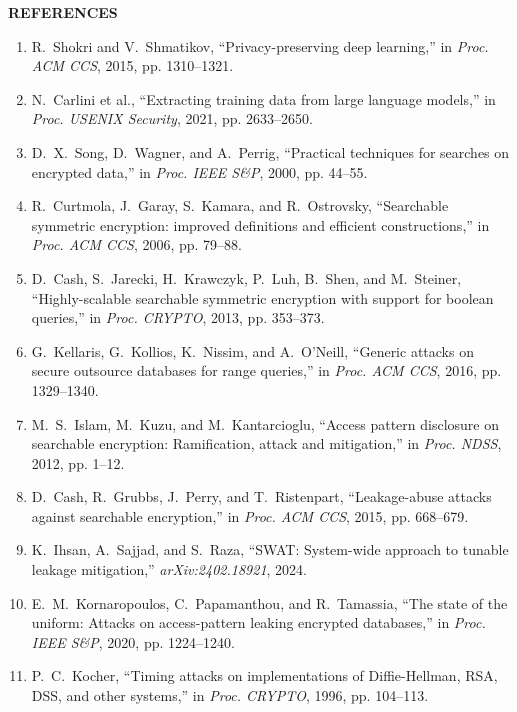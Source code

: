 \documentclass[preview,varwidth=88mm]{standalone}
\begin{document}
\begin{center}
\vspace{-1mm}
{\footnotesize \textbf{REFERENCES}}
\vspace{1mm}
\end{center}
{\scriptsize
\begin{enumerate}
\setlength{\itemsep}{0.5pt}
\setlength{\parskip}{0pt}
\setlength{\parsep}{0pt}
\item[{[1]}] R.~Shokri and V.~Shmatikov, ``Privacy-preserving deep learning,'' in \emph{Proc. ACM CCS}, 2015, pp. 1310--1321.
\item[{[2]}] N.~Carlini et al., ``Extracting training data from large language models,'' in \emph{Proc. USENIX Security}, 2021, pp. 2633--2650.
\item[{[3]}] D.~X.~Song, D.~Wagner, and A.~Perrig, ``Practical techniques for searches on encrypted data,'' in \emph{Proc. IEEE S\&P}, 2000, pp. 44--55.
\item[{[4]}] R.~Curtmola, J.~Garay, S.~Kamara, and R.~Ostrovsky, ``Searchable symmetric encryption: improved definitions and efficient constructions,'' in \emph{Proc. ACM CCS}, 2006, pp. 79--88.
\item[{[5]}] D.~Cash, S.~Jarecki, H.~Krawczyk, P.~Luh, B.~Shen, and M.~Steiner, ``Highly-scalable searchable symmetric encryption with support for boolean queries,'' in \emph{Proc. CRYPTO}, 2013, pp. 353--373.
\item[{[6]}] G.~Kellaris, G.~Kollios, K.~Nissim, and A.~O'Neill, ``Generic attacks on secure outsource databases for range queries,'' in \emph{Proc. ACM CCS}, 2016, pp. 1329--1340.
\item[{[7]}] M.~S.~Islam, M.~Kuzu, and M.~Kantarcioglu, ``Access pattern disclosure on searchable encryption: Ramification, attack and mitigation,'' in \emph{Proc. NDSS}, 2012, pp. 1--12.
\item[{[8]}] D.~Cash, R.~Grubbs, J.~Perry, and T.~Ristenpart, ``Leakage-abuse attacks against searchable encryption,'' in \emph{Proc. ACM CCS}, 2015, pp. 668--679.
\item[{[9]}] K.~Ihsan, A.~Sajjad, and S.~Raza, ``SWAT: System-wide approach to tunable leakage mitigation,'' \emph{arXiv:2402.18921}, 2024.
\item[{[10]}] E.~M.~Kornaropoulos, C.~Papamanthou, and R.~Tamassia, ``The state of the uniform: Attacks on access-pattern leaking encrypted databases,'' in \emph{Proc. IEEE S\&P}, 2020, pp. 1224--1240.
\item[{[11]}] P.~C.~Kocher, ``Timing attacks on implementations of Diffie-Hellman, RSA, DSS, and other systems,'' in \emph{Proc. CRYPTO}, 1996, pp. 104--113.

\end{enumerate}}
\end{document}
